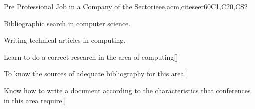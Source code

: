\begin{syllabus}
\begin{unit}{}{Pre Professional Job in a Company of the Sector}{ieee,acm,citeseer}{60}{C1,C20,CS2}
  \begin{topics}
      \item Bibliographic search in computer science.
      \item Writing technical articles in computing.
  \end{topics}
  \begin{learningoutcomes}
      \item Learn to do a correct research in the area of computing[\Usage]
      \item To know the sources of adequate bibliography for this area[\Usage]
      \item Know how to write a document according to the characteristics that conferences in this area require[\Usage]
  \end{learningoutcomes}
\end{unit}



\begin{coursebibliography}
\end{coursebibliography}

\end{syllabus}
